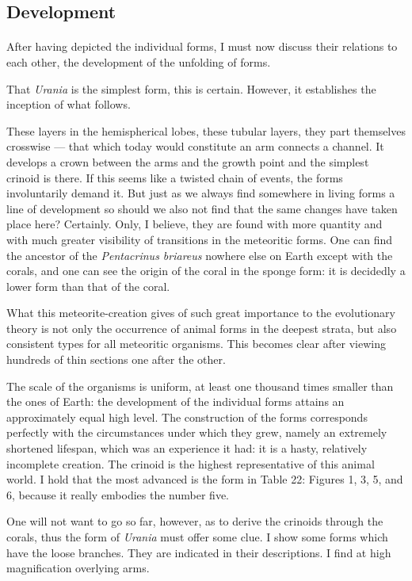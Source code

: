 \documentclass[a4paper, 12pt, oneside]{article}
\begin{document}
\subsection{Development}
\paragraph{}
After having depicted the individual forms, I must now discuss their relations to each other, the development of the unfolding of forms.

That \emph{Urania} is the simplest form, this is certain. However, it establishes the inception of what follows.

These layers in the hemispherical lobes, these tubular layers, they part themselves crosswise — that which today would constitute an arm connects a channel. It develops a crown between the arms and the growth point and the simplest crinoid is there. If this seems like a twisted chain of events, the forms involuntarily demand it. But just as we always find somewhere in living forms a line of development so should we also not find that the same changes have taken place here? Certainly. Only, I believe, they are found with more quantity and with much greater visibility of transitions in the meteoritic forms. One can find the ancestor of the \emph{Pentacrinus briareus} nowhere else on Earth except with the corals, and one can see the origin of the coral in the sponge form: it is decidedly a lower form than that of the coral.

What this meteorite-creation gives of such great importance to the evolutionary theory is not only the occurrence of animal forms in the deepest strata, but also consistent types for all meteoritic organisms. This becomes clear after viewing hundreds of thin sections one after the other.

The scale of the organisms is uniform, at least one thousand times smaller than the ones of Earth: the development of the individual forms attains an approximately equal high level. The construction of the forms corresponds perfectly with the circumstances under which they grew, namely an extremely shortened lifespan, which was an experience it had: it is a hasty, relatively incomplete creation. The crinoid is the highest representative of this animal world. I hold that the most advanced is the form in Table 22: Figures 1, 3, 5, and 6, because it really embodies the number five.

One will not want to go so far, however, as to derive the crinoids through the corals, thus the form of \emph{Urania} must offer some clue. I show some forms which have the loose branches. They are indicated in their descriptions. I find at high magnification overlying arms.
\end{document}
